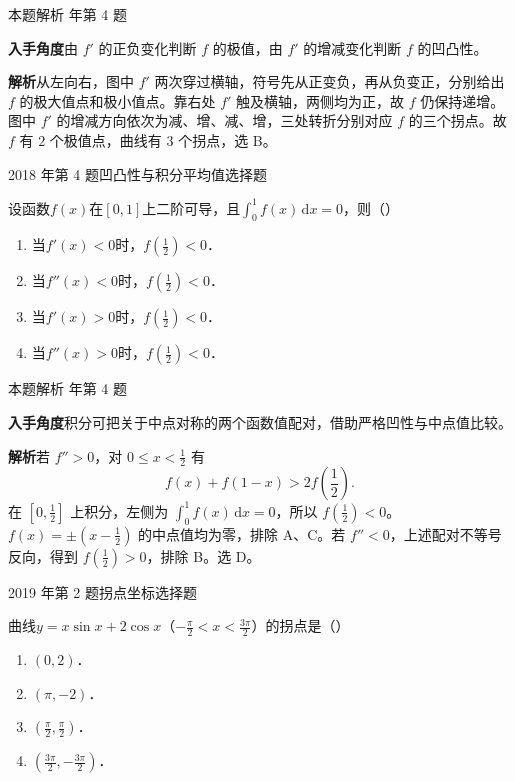 \documentclass[UTF8,zihao=-4,fontset=fandol]{ctexart}
\newcommand{\pickout}{\hfill（\hspace{1.4em}）}
\newenvironment{abcd}{\begin{enumerate}[label=\textup{(\Alph*)},leftmargin=2.3em,itemsep=1pt,topsep=4pt,parsep=1pt]}{\end{enumerate}}
\newcommand{\QuestionPage}[6]{%
  \par\noindent\begin{minipage}{\linewidth}
  \raggedright
  {\small\textcolor{black!60}{#3\quad #5}\hfill\textcolor{accent}{#2}}\par\smallskip}
\newcommand{\QuestionEnd}{\end{minipage}\par\medskip}
\newcommand{\QuestionPage}[6]{%
  \clearpage
  {\small\textcolor{accent}{#1\hfill #2}}\par\medskip
  {\small\textcolor{black!60}{#3\quad #5\hfill #6}}\par\vspace{9bp}}
\newcommand{\QuestionEnd}{}
\newenvironment{QuestionSolution}[1]{%
  \clearpage
  {\small\textcolor{black!60}{本题解析\quad #1}}\par\medskip
}{\par\clearpage}
\begin{document}
\begin{QuestionSolution}{2016 年第 4 题}
\textbf{入手角度}\quad 由 \(f'\) 的正负变化判断 \(f\) 的极值，由 \(f'\) 的增减变化判断 \(f\) 的凹凸性。

\textbf{解析}\quad 从左向右，图中 \(f'\) 两次穿过横轴，符号先从正变负，再从负变正，分别给出 \(f\) 的极大值点和极小值点。靠右处 \(f'\) 触及横轴，两侧均为正，故 \(f\) 仍保持递增。图中 \(f'\) 的增减方向依次为减、增、减、增，三处转折分别对应 \(f\) 的三个拐点。故 \(f\) 有 \(2\) 个极值点，曲线有 \(3\) 个拐点，选 B。
\end{QuestionSolution}

\QuestionPage{2.6 函数性态的研究}{选择题}{2018 年第 4 题}{1}{凹凸性与积分平均值}{109 / 234}
设函数$f(x)$在$[0,1]$上二阶可导，且$\int_0^1 f(x)\,\mathrm{d} x = 0$，则\pickout{}
\begin{abcd}
\item 当$f'(x) < 0$时，$f\left(\frac{1}{2} \right) < 0$．
\item 当$f''(x) < 0$时，$f\left(\frac{1}{2} \right) < 0$．
\item 当$f'(x) > 0$时，$f\left(\frac{1}{2} \right) < 0$．
\item 当$f''(x) > 0$时，$f\left(\frac{1}{2} \right) < 0$．
\end{abcd}
\QuestionEnd

\begin{QuestionSolution}{2018 年第 4 题}
\textbf{入手角度}\quad 积分可把关于中点对称的两个函数值配对，借助严格凹性与中点值比较。

\textbf{解析}\quad 若 \(f''>0\)，对 \(0\le x<\frac{1}{2}\) 有
\[
f(x)+f(1-x)>2f(\frac{1}{2}).
\]
在 \([0,\frac{1}{2}]\) 上积分，左侧为 \(\int_0^1 f(x)\,\mathrm{d}x=0\)，所以 \(f(\frac{1}{2})<0\)。\(f(x)=\pm(x-\frac{1}{2})\) 的中点值均为零，排除 A、C。若 \(f''<0\)，上述配对不等号反向，得到 \(f(\frac{1}{2})>0\)，排除 B。选 D。
\end{QuestionSolution}

\QuestionPage{2.6 函数性态的研究}{选择题}{2019 年第 2 题}{1}{拐点坐标}{110 / 234}
曲线$y = x\sin x + 2\cos x$（$- \frac{\pi}{2} < x < \frac{3\pi}{2}$）的拐点是\pickout{}
\begin{abcd}
\item $(0,2)$．
\item $(\pi , - 2)$．
\item $\left(\frac{\pi}{2},\frac{\pi}{2} \right)$．
\item $\left(\frac{3\pi}{2}, - \frac{3\pi}{2} \right)$．
\end{abcd}
\QuestionEnd
\end{document}
